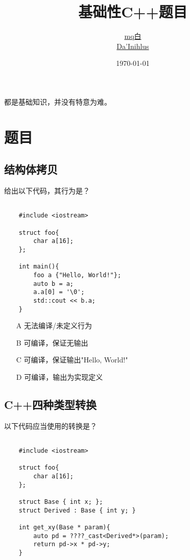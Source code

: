 \documentclass[11pt,fancyhdr]{ctexart}
\title{基础性C++题目}
\author
{
    \href{https://github.com/Mq-b}{mq白}\\
    \href{https://github.com/dynilath}{Da'Inihlus}
}
\date{\today}
\begin{document}
\maketitle

都是基础知识，并没有特意为难。

\section{题目}

\subsection{结构体拷贝}
给出以下代码，其行为是？


\begin{verbatim}

    #include <iostream>

    struct foo{
        char a[16];
    };
    
    int main(){
        foo a {"Hello, World!"};
        auto b = a;
        a.a[0] = '\0';
        std::cout << b.a;
    }
\end{verbatim}

\begin{itemize}
    \item [A]
          无法编译/未定义行为
    \item [B]
          可编译，保证无输出
    \item [C]
          可编译，保证输出"Hello, World!"
    \item [D]
          可编译，输出为实现定义
\end{itemize}

\subsection{C++四种类型转换}

以下代码应当使用的转换是？

\begin{verbatim}

    #include <iostream>

    struct foo{
        char a[16];
    };

    struct Base { int x; };
    struct Derived : Base { int y; }
    
    int get_xy(Base * param){
        auto pd = ????_cast<Derived*>(param);
        return pd->x * pd->y;
    }
\end{verbatim}
\end{document}

